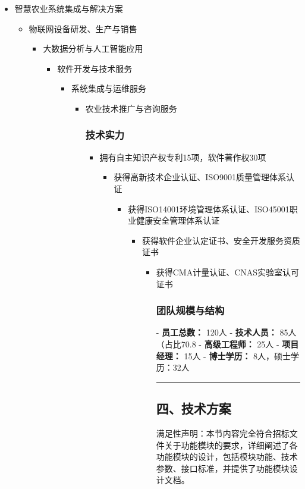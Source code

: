 \documentclass[12pt,a4paper]{article}
\begin{document}
\begin{itemize}
\item 智慧农业系统集成与解决方案
\begin{itemize}
\item 物联网设备研发、生产与销售
\begin{itemize}
\item 大数据分析与人工智能应用
\begin{itemize}
\item 软件开发与技术服务
\begin{itemize}
\item 系统集成与运维服务
\begin{itemize}
\item 农业技术推广与咨询服务

\subsubsection{技术实力}

\begin{itemize}
\item 拥有自主知识产权专利15项，软件著作权30项
\begin{itemize}
\item 获得高新技术企业认证、ISO9001质量管理体系认证
\begin{itemize}
\item 获得ISO14001环境管理体系认证、ISO45001职业健康安全管理体系认证
\begin{itemize}
\item 获得软件企业认定证书、安全开发服务资质证书
\begin{itemize}
\item 获得CMA计量认证、CNAS实验室认可证书

\subsubsection{团队规模与结构}

- \textbf{员工总数：} 120人
- \textbf{技术人员：} 85人（占比70.8%
- \textbf{高级工程师：} 25人
- \textbf{项目经理：} 15人
- \textbf{博士学历：} 8人，硕士学历：32人

\hrule


\subsection{四、技术方案}


满足性声明：本节内容完全符合招标文件关于功能模块的要求，详细阐述了各功能模块的设计，包括模块功能、技术参数、接口标准，并提供了功能模块设计文档。


\end{itemize}
\end{itemize}
\end{itemize}
\end{itemize}
\end{itemize}
\end{itemize}
\end{itemize}
\end{itemize}
\end{itemize}
\end{itemize}
\end{itemize}
\end{document}
